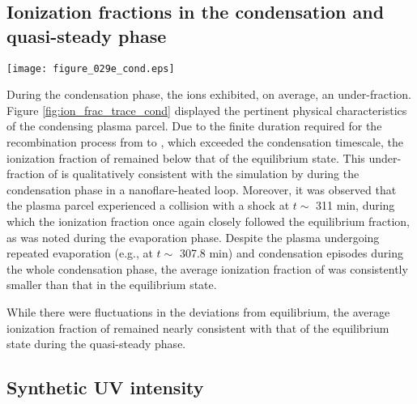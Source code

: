 \documentclass[fleqn,usenatbib]{mnras}
\begin{document}
\subsection{Ionization fractions in the condensation and quasi-steady phase}

\begin{figure*}
	\texttt{[image: figure\_029e\_cond.eps]}
    \caption{ The same format as in the figure \ref{fig:ion_frac_trace} in condensation phase.
    }
    \label{fig:ion_frac_trace_cond}
\end{figure*}

During the condensation phase, the  ions exhibited, on average, an under-fraction.
Figure \ref{fig:ion_frac_trace_cond} displayed the pertinent physical characteristics of the condensing plasma parcel. 
Due to the finite duration required for the recombination process from  to , which exceeded the condensation timescale, the ionization fraction of  remained below that of the equilibrium state. 
This under-fraction of  is qualitatively consistent with the simulation by \cite{1993ApJ...402..741H} during the condensation phase in a nanoflare-heated loop.
Moreover, it was observed that the plasma parcel experienced a collision with a shock at $t\sim$ 311 min, during which the  ionization fraction once again closely followed the equilibrium fraction, as was noted during the evaporation phase. Despite the plasma undergoing repeated evaporation (e.g., at $t\sim$ 307.8 min) and condensation episodes during the whole condensation phase, the average ionization fraction of  was consistently smaller than that in the equilibrium state.

While there were fluctuations in the deviations from equilibrium, the average ionization fraction of  remained nearly consistent with that of the equilibrium state during the quasi-steady phase.

\subsection{Synthetic UV intensity}
\end{document}
